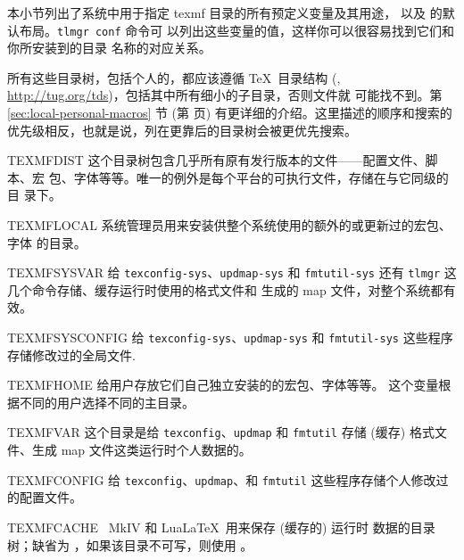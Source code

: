 \documentclass{article}
\begin{document}
本小节列出了系统中用于指定 texmf 目录的所有预定义变量及其用途，
以及 \TL{} 的默认布局。\texttt{tlmgr~conf} 命令可
以列出这些变量的值，这样你可以很容易找到它们和你所安装到的目录
名称的对应关系。

所有这些目录树，包括个人的，都应该遵循 \TeX\ 目录结构 (\TDS,
\url{http://tug.org/tds})，包括其中所有细小的子目录，否则文件就
可能找不到。第 \ref{sec:local-personal-macros} 节 (第
\pageref{sec:local-personal-macros} 页) 有更详细的介绍。这里描述的顺序和搜索的
优先级相反，也就是说，列在更靠后的目录树会被更优先搜索。

\begin{ttdescription}
\item [TEXMFDIST] 这个目录树包含几乎所有原有发行版本的文件——配置文件、脚本、宏
包、字体等等。唯一的例外是每个平台的可执行文件，存储在与它同级的  目
录下。
\item [TEXMFLOCAL] 系统管理员用来安装供整个系统使用的额外的或更新过的宏包、字体
的目录。
\item [TEXMFSYSVAR] 给 \verb+texconfig-sys+、\verb+updmap-sys+ 和
\verb+fmtutil-sys+ 还有 \verb+tlmgr+ 这几个命令存储、缓存运行时使用的格式文件和
生成的 map 文件，对整个系统都有效。
\item [TEXMFSYSCONFIG] 给 \verb+texconfig-sys+、\verb+updmap-sys+ 和
\verb+fmtutil-sys+ 这些程序存储修改过的全局文件.
\item [TEXMFHOME] 给用户存放它们自己独立安装的的宏包、字体等等。
这个变量根据不同的用户选择不同的主目录。
\item [TEXMFVAR] 这个目录是给 \verb+texconfig+、\verb+updmap+ 和
  \verb+fmtutil+ 存储 (缓存) 格式文件、生成 map 文件这类运行时个人数据的。
\item [TEXMFCONFIG] 给 \verb+texconfig+、\verb+updmap+、和 \verb+fmtutil+
这些程序存储个人修改过的配置文件。
\item [TEXMFCACHE] \ConTeXt\ MkIV 和 Lua\LaTeX\ 用来保存 (缓存的) 运行时
数据的目录树；缺省为 ，如果该目录不可写，则使用
。
\end{ttdescription}
\end{document}
